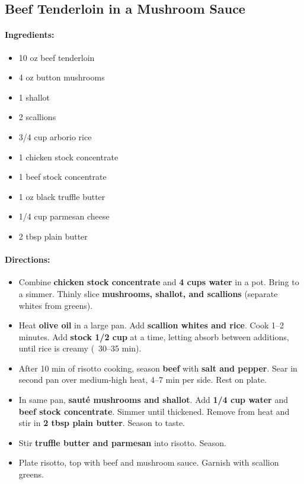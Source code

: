 \documentclass{article}
\begin{document}
\subsection{Beef Tenderloin in a Mushroom Sauce}

\paragraph{Ingredients:}
\begin{itemize}
    \item 10 oz beef tenderloin
    \item 4 oz button mushrooms
    \item 1 shallot
    \item 2 scallions
    \item 3/4 cup arborio rice
    \item 1 chicken stock concentrate
    \item 1 beef stock concentrate
    \item 1 oz black truffle butter
    \item 1/4 cup parmesan cheese
    \item 2 tbsp plain butter
\end{itemize}

\paragraph{Directions:}
\begin{itemize}
    \item Combine \textbf{chicken stock concentrate} and \textbf{4 cups water} in a pot. Bring to a simmer. Thinly slice \textbf{mushrooms, shallot, and scallions} (separate whites from greens).
    \item Heat \textbf{olive oil} in a large pan. Add \textbf{scallion whites and rice}. Cook 1–2 minutes. Add \textbf{stock 1/2 cup} at a time, letting absorb between additions, until rice is creamy (~30–35 min).
    \item After 10 min of risotto cooking, season \textbf{beef} with \textbf{salt and pepper}. Sear in second pan over medium-high heat, 4–7 min per side. Rest on plate.
    \item In same pan, \textbf{sauté mushrooms and shallot}. Add \textbf{1/4 cup water} and \textbf{beef stock concentrate}. Simmer until thickened. Remove from heat and stir in \textbf{2 tbsp plain butter}. Season to taste.
    \item Stir \textbf{truffle butter and parmesan} into risotto. Season.
    \item Plate risotto, top with beef and mushroom sauce. Garnish with scallion greens.
\end{itemize}
\end{document}
